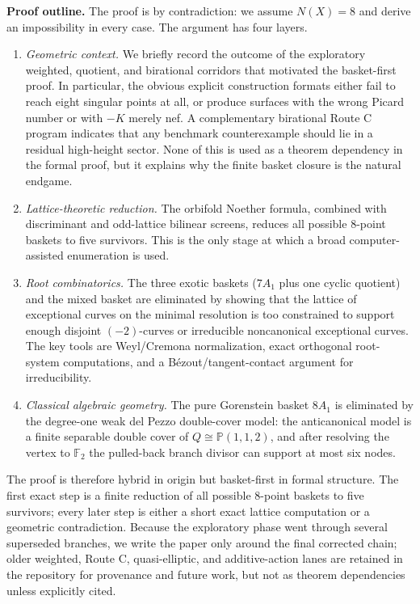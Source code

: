 \documentclass[11pt]{article}
\theoremstyle{definition}
\newcommand{\Pbb}{\mathbb P}
\begin{document}
\medskip
\noindent
\textbf{Proof outline.}
The proof is by contradiction: we assume $N(X)=8$ and derive an impossibility in every case.
The argument has four layers.
\begin{enumerate}[label=\textup{(\arabic*)}]
\item\emph{Geometric context.} We briefly record the outcome of the exploratory weighted, quotient, and birational corridors that motivated the basket-first proof. In particular, the obvious explicit construction formats either fail to reach eight singular points at all, or produce surfaces with the wrong Picard number or with $-K$ merely nef. A complementary birational Route C program indicates that any benchmark counterexample should lie in a residual high-height sector. None of this is used as a theorem dependency in the formal proof, but it explains why the finite basket closure is the natural endgame.
\item\emph{Lattice-theoretic reduction.} The orbifold Noether formula, combined with discriminant and odd-lattice bilinear screens, reduces all possible $8$-point baskets to five survivors. This is the only stage at which a broad computer-assisted enumeration is used.
\item\emph{Root combinatorics.} The three exotic baskets ($7A_1$ plus one cyclic quotient) and the mixed basket are eliminated by showing that the lattice of exceptional curves on the minimal resolution is too constrained to support enough disjoint $(-2)$-curves or irreducible noncanonical exceptional curves. The key tools are Weyl/Cremona normalization, exact orthogonal root-system computations, and a B\'ezout/tangent-contact argument for irreducibility.
\item\emph{Classical algebraic geometry.} The pure Gorenstein basket $8A_1$ is eliminated by the degree-one weak del Pezzo double-cover model: the anticanonical model is a finite separable double cover of $Q\cong\Pbb(1,1,2)$, and after resolving the vertex to $\mathbb F_2$ the pulled-back branch divisor can support at most six nodes.
\end{enumerate}

The proof is therefore hybrid in origin but basket-first in formal structure. The first exact step is a finite reduction of all possible $8$-point baskets to five survivors; every later step is either a short exact lattice computation or a geometric contradiction. Because the exploratory phase went through several superseded branches, we write the paper only around the final corrected chain; older weighted, Route C, quasi-elliptic, and additive-action lanes are retained in the repository for provenance and future work, but not as theorem dependencies unless explicitly cited.
\end{document}
